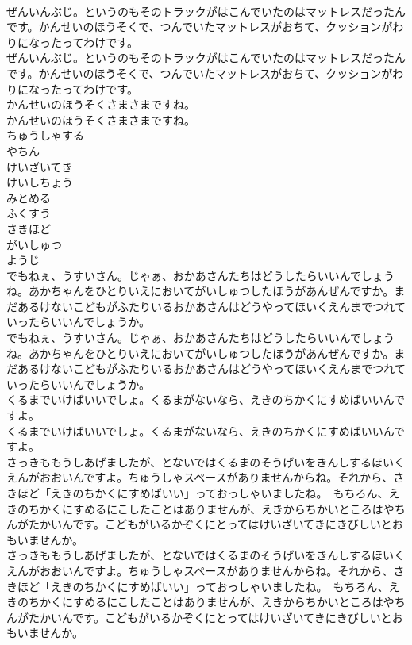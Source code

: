 \documentclass[8pt]{extreport}
\begin{document}
\begin{CJK}{UTF8}{min}
\\	ぜんいんぶじ。というのもそのトラックがはこんでいたのはマットレスだったんです。かんせいのほうそくで、つんでいたマットレスがおちて、クッションがわりになったってわけです。	
\\	ぜんいんぶじ。というのもそのトラックがはこんでいたのはマットレスだったんです。かんせいのほうそくで、つんでいたマットレスがおちて、クッションがわりになったってわけです。 
\\	かんせいのほうそくさまさまですね。	
\\	かんせいのほうそくさまさまですね。 
\\	ちゅうしゃする
\\	やちん
\\	けいざいてき
\\	けいしちょう
\\	みとめる
\\	ふくすう
\\	さきほど
\\	がいしゅつ
\\	ようじ
\\	でもねぇ、うすいさん。じゃぁ、おかあさんたちはどうしたらいいんでしょうね。あかちゃんをひとりいえにおいてがいしゅつしたほうがあんぜんですか。まだあるけないこどもがふたりいるおかあさんはどうやってほいくえんまでつれていったらいいんでしょうか。	
\\	でもねぇ、うすいさん。じゃぁ、おかあさんたちはどうしたらいいんでしょうね。あかちゃんをひとりいえにおいてがいしゅつしたほうがあんぜんですか。まだあるけないこどもがふたりいるおかあさんはどうやってほいくえんまでつれていったらいいんでしょうか。 
\\	くるまでいけばいいでしょ。くるまがないなら、えきのちかくにすめばいいんですよ。	
\\	くるまでいけばいいでしょ。くるまがないなら、えきのちかくにすめばいいんですよ。 
\\	さっきももうしあげましたが、とないではくるまのそうげいをきんしするほいくえんがおおいんですよ。ちゅうしゃスペースがありませんからね。それから、さきほど「えきのちかくにすめばいい」っておっしゃいましたね。　もちろん、えきのちかくにすめるにこしたことはありませんが、えきからちかいところはやちんがたかいんです。こどもがいるかぞくにとってはけいざいてきにきびしいとおもいませんか。	
\\	さっきももうしあげましたが、とないではくるまのそうげいをきんしするほいくえんがおおいんですよ。ちゅうしゃスペースがありませんからね。それから、さきほど「えきのちかくにすめばいい」っておっしゃいましたね。　もちろん、えきのちかくにすめるにこしたことはありませんが、えきからちかいところはやちんがたかいんです。こどもがいるかぞくにとってはけいざいてきにきびしいとおもいませんか。 

\end{CJK}
\end{document}
